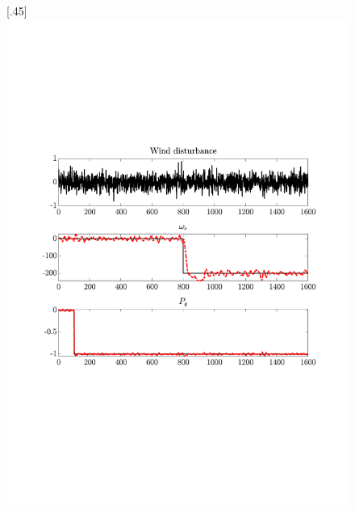 \begin{figure}[H]
[.45\textwidth]{\includegraphics[width=1\linewidth, scale=1, trim=60 230 55 150,clip]{fig/Open_loop/exp_6_ref.pdf}}
\\

\end{figure}
